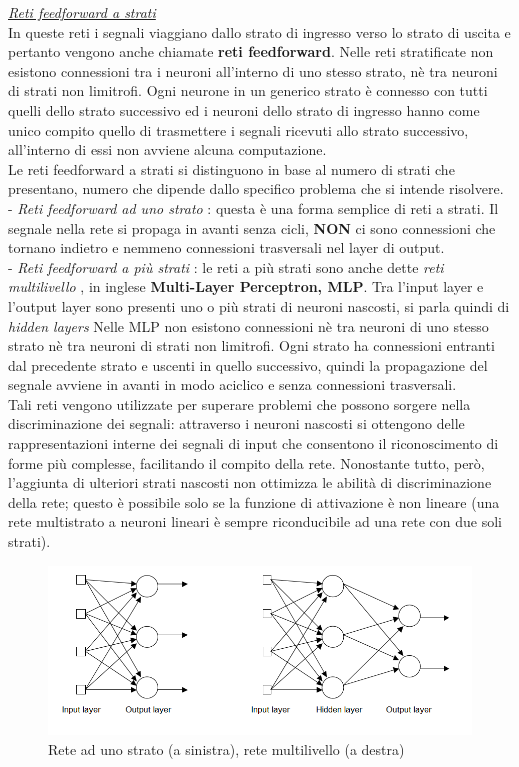 \documentclass[12pt,a4paper,oneside]{book}
\begin{document}
		\underline{\emph{Reti feedforward a strati}}\\
		In queste reti i segnali viaggiano dallo strato di ingresso verso lo strato di uscita e pertanto vengono anche chiamate \textbf{reti feedforward}. Nelle reti stratificate non esistono connessioni tra i neuroni all'interno di uno stesso strato, nè tra neuroni di strati non limitrofi. Ogni neurone in un generico strato è connesso con tutti quelli dello strato successivo ed i neuroni dello strato di ingresso hanno come unico compito quello di trasmettere i segnali ricevuti allo strato successivo, all'interno di essi non avviene alcuna computazione.\\
		Le reti feedforward a strati si distinguono in base al numero di strati che presentano, numero che dipende dallo specifico problema che si intende risolvere.\\ 
		- \emph{Reti feedforward ad uno strato} : questa è una forma semplice di reti a strati. Il segnale nella rete si propaga in avanti senza cicli, \textbf{NON} ci sono connessioni che tornano indietro e nemmeno connessioni trasversali nel layer di output.\\
		- \emph{Reti feedforward a più strati }: le reti a più strati sono anche dette \textit{reti multilivello }, in inglese \textbf{\textit{}Multi-Layer Perceptron, MLP}. Tra l'input layer e l'output layer sono presenti uno o più strati di neuroni nascosti, si parla quindi di \textit{\textit{hidden layers}} Nelle MLP non esistono connessioni nè tra neuroni di uno stesso strato nè tra neuroni di strati non limitrofi. Ogni strato ha connessioni entranti dal precedente strato e uscenti in quello successivo, quindi la propagazione del segnale avviene in avanti in modo aciclico e senza connessioni trasversali.\\
		Tali reti vengono utilizzate per superare problemi che possono sorgere nella discriminazione dei segnali: attraverso i neuroni nascosti si ottengono delle rappresentazioni interne dei segnali di input che consentono il riconoscimento di forme più complesse, facilitando il compito della rete. 
		Nonostante tutto, però, l’aggiunta di ulteriori strati nascosti non ottimizza le abilità di discriminazione della rete; questo è possibile solo se la funzione di attivazione è non lineare (una rete multistrato a neuroni lineari è sempre riconducibile ad una rete con due soli strati).\\ 
		
		\clearpage
		\begin{figure}[h]
			\centering
			\includegraphics[width=1\linewidth]{IMMAGINI/unostrato}
			\caption{Rete ad uno strato (a sinistra), rete multilivello (a destra)}
			\label{fig:multistrato}
		\end{figure}
	
\end{document}
